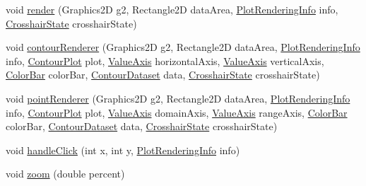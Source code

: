 \begin{DoxyCompactItemize}
\item 
void \mbox{\hyperlink{classorg_1_1jfree_1_1chart_1_1plot_1_1_contour_plot_adfc09492a07fc0eb21b73b9b589804ef}{render}} (Graphics2D g2, Rectangle2D data\+Area, \mbox{\hyperlink{classorg_1_1jfree_1_1chart_1_1plot_1_1_plot_rendering_info}{Plot\+Rendering\+Info}} info, \mbox{\hyperlink{classorg_1_1jfree_1_1chart_1_1plot_1_1_crosshair_state}{Crosshair\+State}} crosshair\+State)
\item 
void \mbox{\hyperlink{classorg_1_1jfree_1_1chart_1_1plot_1_1_contour_plot_ad2102c8be2fcaae52134c5389bccdcfe}{contour\+Renderer}} (Graphics2D g2, Rectangle2D data\+Area, \mbox{\hyperlink{classorg_1_1jfree_1_1chart_1_1plot_1_1_plot_rendering_info}{Plot\+Rendering\+Info}} info, \mbox{\hyperlink{classorg_1_1jfree_1_1chart_1_1plot_1_1_contour_plot}{Contour\+Plot}} plot, \mbox{\hyperlink{classorg_1_1jfree_1_1chart_1_1axis_1_1_value_axis}{Value\+Axis}} horizontal\+Axis, \mbox{\hyperlink{classorg_1_1jfree_1_1chart_1_1axis_1_1_value_axis}{Value\+Axis}} vertical\+Axis, \mbox{\hyperlink{classorg_1_1jfree_1_1chart_1_1axis_1_1_color_bar}{Color\+Bar}} color\+Bar, \mbox{\hyperlink{interfaceorg_1_1jfree_1_1data_1_1contour_1_1_contour_dataset}{Contour\+Dataset}} data, \mbox{\hyperlink{classorg_1_1jfree_1_1chart_1_1plot_1_1_crosshair_state}{Crosshair\+State}} crosshair\+State)
\item 
void \mbox{\hyperlink{classorg_1_1jfree_1_1chart_1_1plot_1_1_contour_plot_aba5e59055ea664fb00f2371d2b4b1699}{point\+Renderer}} (Graphics2D g2, Rectangle2D data\+Area, \mbox{\hyperlink{classorg_1_1jfree_1_1chart_1_1plot_1_1_plot_rendering_info}{Plot\+Rendering\+Info}} info, \mbox{\hyperlink{classorg_1_1jfree_1_1chart_1_1plot_1_1_contour_plot}{Contour\+Plot}} plot, \mbox{\hyperlink{classorg_1_1jfree_1_1chart_1_1axis_1_1_value_axis}{Value\+Axis}} domain\+Axis, \mbox{\hyperlink{classorg_1_1jfree_1_1chart_1_1axis_1_1_value_axis}{Value\+Axis}} range\+Axis, \mbox{\hyperlink{classorg_1_1jfree_1_1chart_1_1axis_1_1_color_bar}{Color\+Bar}} color\+Bar, \mbox{\hyperlink{interfaceorg_1_1jfree_1_1data_1_1contour_1_1_contour_dataset}{Contour\+Dataset}} data, \mbox{\hyperlink{classorg_1_1jfree_1_1chart_1_1plot_1_1_crosshair_state}{Crosshair\+State}} crosshair\+State)
\item 
void \mbox{\hyperlink{classorg_1_1jfree_1_1chart_1_1plot_1_1_contour_plot_aed3e1bcd8ab24faf99eab43d048985fa}{handle\+Click}} (int x, int y, \mbox{\hyperlink{classorg_1_1jfree_1_1chart_1_1plot_1_1_plot_rendering_info}{Plot\+Rendering\+Info}} info)
\item 
void \mbox{\hyperlink{classorg_1_1jfree_1_1chart_1_1plot_1_1_contour_plot_a260dcb53151c57ad799a481d6bc265db}{zoom}} (double percent)

\end{DoxyCompactItemize}
